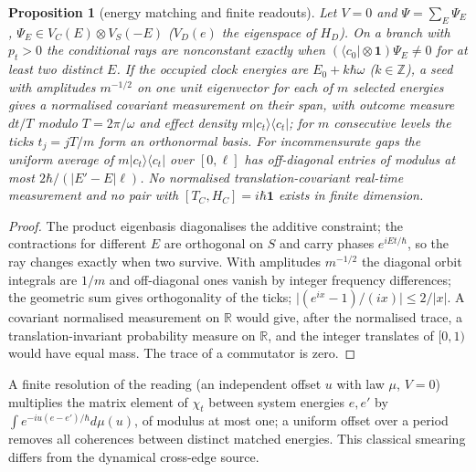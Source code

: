 \documentclass[aps,pra,onecolumn,superscriptaddress,nofootinbib,10pt]{revtex4-2}
\newtheorem{proposition}[theorem]{Proposition}
\theoremstyle{definition}
\theoremstyle{remark}
\newcommand{\R}{\mathbb{R}}
\newcommand{\Z}{\mathbb{Z}}
\begin{document}
\begin{proposition}[energy matching and finite readouts]\label{prop:cuspectrum}
Let $V=0$ and $\Psi=\sum_E\Psi_E$, $\Psi_E\in V_C(E)\otimes V_S(-E)$ ($V_D(e)$ the eigenspace of $H_D$).  On a branch with $p_t>0$ the
conditional rays are nonconstant exactly when $(\langle c_0\rvert\otimes\mathbf1)\Psi_E\ne0$ for at least two distinct $E$.  If the occupied
clock energies are $E_0+k\hbar\omega$ ($k\in\Z$), a seed with amplitudes $m^{-1/2}$ on one unit eigenvector for each of $m$
selected energies gives a normalised covariant measurement on their span, with outcome measure $dt/T$
modulo $T=2\pi/\omega$ and effect density $m\lvert c_t\rangle\langle c_t\rvert$; for $m$ consecutive levels the ticks $t_j=jT/m$ form an orthonormal
basis.  For incommensurate gaps the uniform average of $m\lvert c_t\rangle\langle c_t\rvert$ over $[0,\ell]$ has off-diagonal entries of modulus at
most $2\hbar/(\lvert E'-E\rvert\ell)$.  No normalised translation-covariant real-time measurement and no pair with
$[T_C,H_C]=i\hbar\mathbf1$ exists in finite dimension.
\end{proposition}
\begin{proof}
The product eigenbasis diagonalises the additive constraint; the contractions for different $E$ are
orthogonal on $S$ and carry phases $e^{iEt/\hbar}$, so the ray changes exactly when two survive.  With amplitudes
$m^{-1/2}$ the diagonal orbit integrals are $1/m$ and off-diagonal ones vanish by integer frequency
differences; the geometric sum gives orthogonality of the ticks; $\lvert(e^{ix}-1)/(ix)\rvert\le2/\lvert x\rvert$.  A covariant
normalised measurement on $\R$ would give, after the normalised trace, a translation-invariant probability
measure on $\R$, and the integer translates of $[0,1)$ would have equal mass.  The trace of a commutator
is zero.
\end{proof}
\noindent A finite resolution of the reading (an independent offset $u$ with law $\mu$, $V=0$) multiplies the matrix
element of $\chi_t$ between system energies $e,e'$ by $\int e^{-iu(e-e')/\hbar}d\mu(u)$, of modulus at most one; a uniform offset over
a period removes all coherences between distinct matched energies.  This classical smearing differs
from the dynamical cross-edge source.
\end{document}
